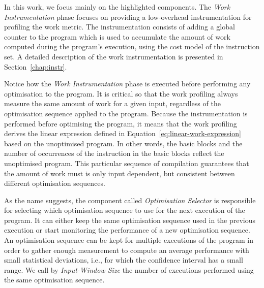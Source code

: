 \documentclass[sigplan,10pt]{acmart}
\theoremstyle{definition}
\newcommand{\itercomp}{{iterative compilation}}
\begin{document}
In this work, we focus mainly on the highlighted components.
The \textit{Work Instrumentation} phase focuses on providing a low-overhead instrumentation for profiling the work metric.
The instrumentation consists of adding a global counter to the program which is used to accumulate the amount of work computed during the program's execution, using the cost model of the instruction set.
A detailed description of the work instrumentation is presented in Section~\ref{chap:instr}.

Notice how the \textit{Work Instrumentation} phase is executed before performing any optimisation to the program.
It is critical so that the work profiling always measure the same amount of work for a given input, regardless of the optimisation sequence applied to the program.
Because the instrumentation is performed before optimising the program, it means that the work profiling derives the linear expression defined in Equation~\ref{eq:linear-work-expression}
based on the unoptimised program.
In other words, the basic blocks and the number of occurrences of the instruction in the basic blocks reflect the unoptimised program.
This particular sequence of compilation guarantees that the amount of work must is only input dependent, but consistent between different optimisation sequences.



As the name suggests, the component called \textit{Optimisation Selector} is responsible for selecting which optimisation sequence to use for the next execution of the program.
It can either keep the same optimisation sequence used in the previous execution or start monitoring the performance of a new optimisation sequence.
An optimisation sequence can be kept for multiple executions of the program in order to gather enough measurement to compute an average performance with small statistical deviations, i.e., for which the confidence interval has a small range.
We call by \textit{Input-Window Size} the number of executions performed using the same optimisation sequence.
\end{document}
